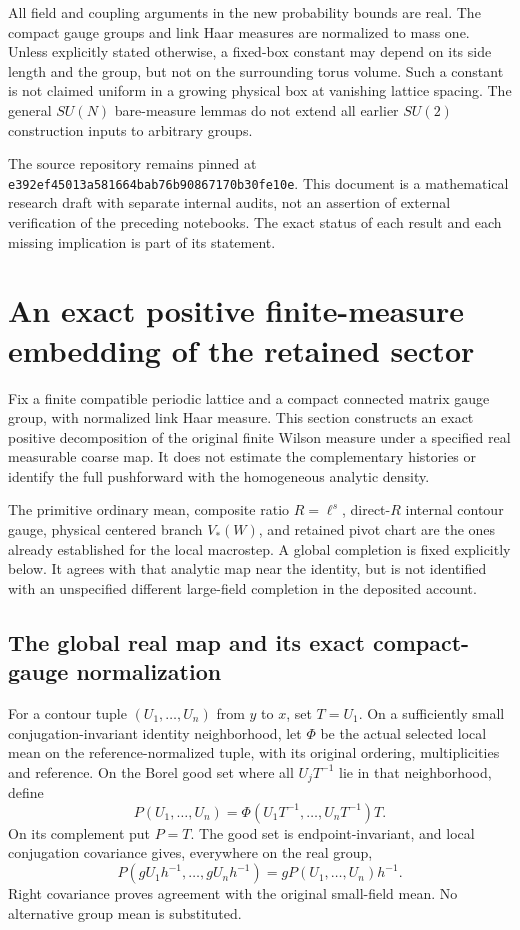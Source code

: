 \documentclass[11pt]{article}
\theoremstyle{remark}
\begin{document}
All field and coupling arguments in the new probability bounds
are real. The compact gauge groups and link Haar measures are
normalized to mass one. Unless explicitly stated otherwise, a
fixed-box constant may depend on its side length and the group,
but not on the surrounding torus volume. Such a constant is not
claimed uniform in a growing physical box at vanishing lattice
spacing. The general \(SU(N)\) bare-measure lemmas do not extend
all earlier \(SU(2)\) construction inputs to arbitrary groups.

The source repository remains pinned at
\texttt{e392ef4501\allowbreak 3a581664ba\allowbreak b76b908671\allowbreak 70b30fe10e}. This document is
a mathematical research draft with separate internal audits, not
an assertion of external verification of the preceding notebooks.
The exact status of each result and each missing implication is
part of its statement.



\section{An exact positive finite-measure embedding of the retained sector}
\label{fps-section}

Fix a finite compatible periodic lattice and a compact connected matrix
gauge group, with normalized link Haar measure. This section constructs
an exact positive decomposition of the original finite Wilson measure
under a specified real measurable coarse map. It does not estimate the
complementary histories or identify the full pushforward with the
homogeneous analytic density.

The primitive ordinary mean, composite ratio \(R=\ell^s\), direct-\(R\)
internal contour gauge, physical centered branch \(V_*(W)\), and retained
pivot chart are the ones already established for the local macrostep.
A global completion is fixed explicitly below. It agrees with that
analytic map near the identity, but is not identified with an unspecified
different large-field completion in the deposited account.

\subsection{The global real map and its exact compact-gauge normalization}
\label{fps-completion-section}

For a contour tuple \((U_1,\ldots,U_n)\) from \(y\) to \(x\), set
\(T=U_1\). On a sufficiently small conjugation-invariant identity
neighborhood, let \(\Phi\) be the actual selected local mean on the
reference-normalized tuple, with its original ordering, multiplicities
and reference. On the Borel good set where all \(U_jT^{-1}\) lie in that
neighborhood, define
\[
 P(U_1,\ldots,U_n)=\Phi(U_1T^{-1},\ldots,U_nT^{-1})T.
\]
On its complement put \(P=T\). The good set is endpoint-invariant, and
local conjugation covariance gives, everywhere on the real group,
\[
 P(gU_1h^{-1},\ldots,gU_nh^{-1})=gP(U_1,\ldots,U_n)h^{-1}.
\]
Right covariance proves agreement with the original small-field mean.
No alternative group mean is substituted.
\end{document}
